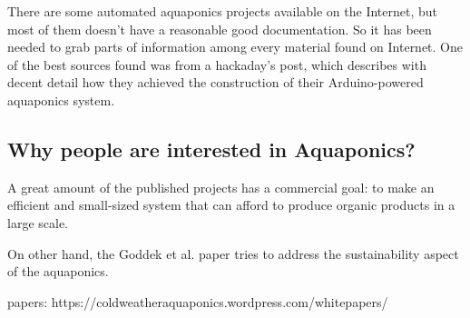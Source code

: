 There are some automated aquaponics projects available on the Internet,
but most of them doesn't have a reasonable good documentation.
So it has been needed to grab parts of information among every material found on Internet.
One of the best sources found was from a hackaday's post,
which describes with decent detail how they achieved the construction of their Arduino-powered aquaponics system.

\subsection{Why people are interested in Aquaponics?}

A great amount of the published projects has a commercial goal:
to make an efficient and small-sized system that can afford to produce organic products in a large scale.

On other hand,
the Goddek et al. paper \cite{goddek2015challenges} tries to address the sustainability aspect of the aquaponics.

papers: https://coldweatheraquaponics.wordpress.com/whitepapers/

